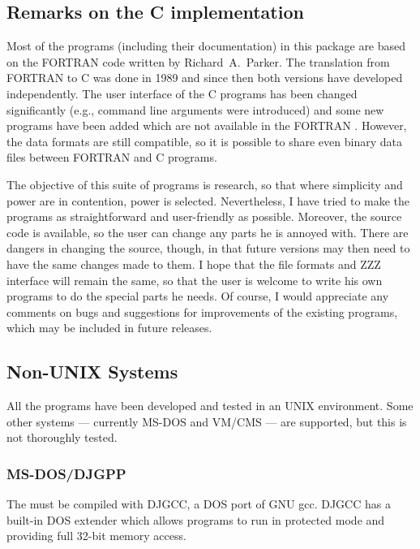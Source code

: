 \subsection*{Remarks on the C implementation}
Most of the programs (including their documentation) in this package
are based on the FORTRAN code written by Richard~A.~Parker. The
translation from FORTRAN to C was
done in 1989 and since then both versions have developed independently.
The user interface of the C programs has been changed significantly
(e.g., command line arguments were introduced) and some new programs
have been added which are not available in the FORTRAN {\MeatAxe}.
However, the data formats are still compatible, so it is possible to
share even binary data files between FORTRAN and C programs.

The objective of this suite of programs is research, so that where
simplicity and power are in contention, power is selected. Nevertheless,
I have tried to make the programs as straightforward and user-friendly
as possible. Moreover, the source code is available, so the user can
change any parts he is annoyed with. There are dangers in changing the
source, though, in that future versions may then need to have the same
changes made to them. I hope that the file formats and ZZZ interface
will remain the same, so that the user is welcome to write his own
programs to do the special parts he needs.
Of course, I would appreciate any comments on bugs and suggestions for
improvements of the existing programs, which may be included in future
releases.



\subsection*{Non-UNIX Systems}
All the programs have been developed and tested in an UNIX
environment. Some other systems --- currently MS-DOS and VM/CMS
--- are supported, but this is not thoroughly tested.


\subsubsection*{MS-DOS/DJGPP}
The {\MeatAxe} must be compiled with DJGCC, a DOS port of
GNU gcc. DJGCC has a built-in DOS extender which allows
programs to run in protected mode and providing full 32-bit
memory access.

